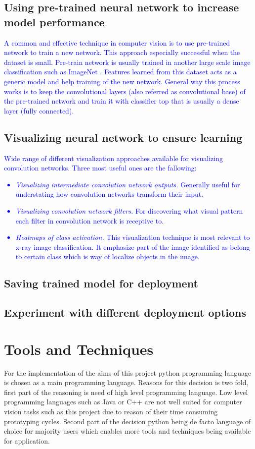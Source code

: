 \documentclass[12pt, twoside, a4paper]{article}
\begin{document}
\subsection{Using pre-trained neural network to increase model performance}
\textcolor{blue}{A common and effective technique in computer vision is to use pre-trained network to train a new network. This approach especially successful when the dataset is small. Pre-train network is usually trained in another large scale image classification such as ImageNet \cite{imagenet}. Features learned from this dataset acts as a generic model and help training of the new network. General way this process works is to keep the convolutional layers (also referred as convolutional base) of the pre-trained network and train it with classifier top that is usually a dense layer (fully connected).}

\subsection{Visualizing neural network to ensure learning}
\textcolor{blue}{
Wide range of different visualization approaches available for visualizing convolution networks. Three most useful ones are the fallowing:
\begin{itemize}
    \item \textit{Visualizing intermediate convolution network outputs.} Generally useful for understating how convolution networks transform their input.
    \item \textit{Visualizing convolution network filters.} For discovering what visual pattern each filter in convolution network is receptive to.
    \item \textit{Heatmaps of class activation.} This visualization technique is most relevant to x-ray image classification. It emphasize part of the image identified as belong to certain class which is way of localize objects in the image. 
\end{itemize}
}

\subsection{Saving trained model for deployment}

\subsection{Experiment with different deployment options}

\section{Tools and Techniques}
For the implementation of the aims of this project python programming language is chosen as a main programming language. Reasons for this decision is two fold, first part of the reasoning is need of high level programming language. Low level programming languages such as Java or C++ are not well suited for computer vision tasks such as this project due to reason of their time consuming prototyping cycles. Second part of the decision python being de facto language of choice for majority users which enables more tools and techniques being available for application. 
\end{document}
